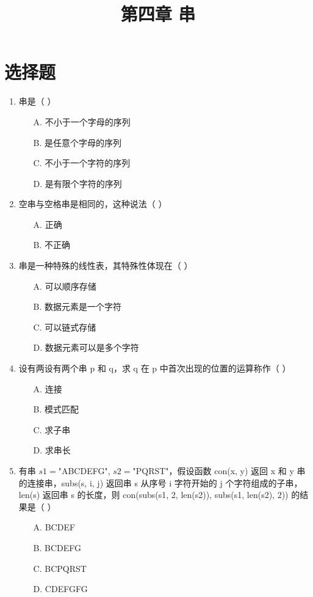\documentclass[12pt, a4paper]{article}
\title{\textbf{第四章 串}}
\author{}
\date{}
\begin{document}
\section*{选择题}

\begin{enumerate}[label=\arabic*.]
	\item 串是（ ）
	      \begin{enumerate}
		      \item[A.] 不小于一个字母的序列
		      \item[B.] 是任意个字母的序列
		      \item[C.] 不小于一个字符的序列
		      \item[D.] 是有限个字符的序列
	      \end{enumerate}

	\item 空串与空格串是相同的，这种说法（ ）
	      \begin{enumerate}
		      \item[A.] 正确
		      \item[B.] 不正确
	      \end{enumerate}

	\item 串是一种特殊的线性表，其特殊性体现在（ ）
	      \begin{enumerate}
		      \item[A.] 可以顺序存储
		      \item[B.] 数据元素是一个字符
		      \item[C.] 可以链式存储
		      \item[D.] 数据元素可以是多个字符
	      \end{enumerate}

	\item 设有两设有两个串 p 和 q，求 q 在 p 中首次出现的位置的运算称作（ ）
	      \begin{enumerate}
		      \item[A.] 连接
		      \item[B.] 模式匹配
		      \item[C.] 求子串
		      \item[D.] 求串长
	      \end{enumerate}

	\item 有串 $s1=$"ABCDEFG", $s2=$"PQRST"，假设函数 con(x, y) 返回 x 和 y 串的连接串，subs(s, i, j) 返回串 s 从序号 i 字符开始的 j 个字符组成的子串，len(s) 返回串 s 的长度，则 con(subs(s1, 2, len(s2)), subs(s1, len(s2), 2)) 的结果是（ ）
	      \begin{enumerate}
		      \item[A.] BCDEF
		      \item[B.] BCDEFG
		      \item[C.] BCPQRST
		      \item[D.] CDEFGFG
	      \end{enumerate}


\end{enumerate}
\end{document}
